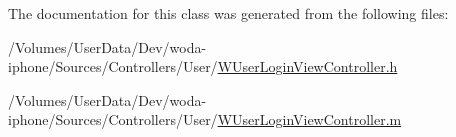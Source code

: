 The documentation for this class was generated from the following files\-:\begin{DoxyCompactItemize}
\item 
/\-Volumes/\-User\-Data/\-Dev/woda-\/iphone/\-Sources/\-Controllers/\-User/\hyperlink{_w_user_login_view_controller_8h}{W\-User\-Login\-View\-Controller.\-h}\item 
/\-Volumes/\-User\-Data/\-Dev/woda-\/iphone/\-Sources/\-Controllers/\-User/\hyperlink{_w_user_login_view_controller_8m}{W\-User\-Login\-View\-Controller.\-m}\end{DoxyCompactItemize}
